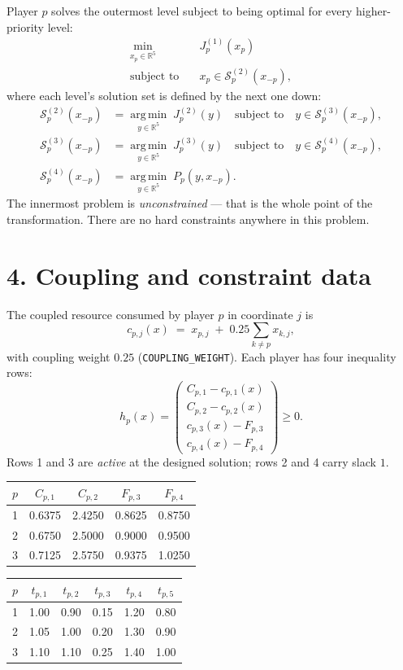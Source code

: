 \documentclass[11pt]{article}
\newcommand{\argmin}{\operatorname*{arg\,min}}
\begin{document}
Player \(p\) solves the outermost level subject to being optimal for every higher-priority
level:
\[
\begin{aligned}
  \min_{x_p \in \mathbb{R}^5} \quad & J_p^{(1)}(x_p) \\
  \text{subject to} \quad & x_p \in \mathcal{S}_p^{(2)}(x_{-p}),
\end{aligned}
\]
where each level's solution set is defined by the next one down:
\[
\begin{aligned}
  \mathcal{S}_p^{(2)}(x_{-p}) &= \argmin_{y \in \mathbb{R}^5} \; J_p^{(2)}(y)
    \quad \text{subject to} \quad y \in \mathcal{S}_p^{(3)}(x_{-p}), \\
  \mathcal{S}_p^{(3)}(x_{-p}) &= \argmin_{y \in \mathbb{R}^5} \; J_p^{(3)}(y)
    \quad \text{subject to} \quad y \in \mathcal{S}_p^{(4)}(x_{-p}), \\
  \mathcal{S}_p^{(4)}(x_{-p}) &= \argmin_{y \in \mathbb{R}^5} \; P_p(y, x_{-p}).
\end{aligned}
\]
The innermost problem is \emph{unconstrained} --- that is the whole point of the
transformation. There are no hard constraints anywhere in this problem.

\section*{4. Coupling and constraint data}

The coupled resource consumed by player \(p\) in coordinate \(j\) is
\[
  c_{p,j}(x) \;=\; x_{p,j} \;+\; 0.25 \sum_{k \neq p} x_{k,j},
\]
with coupling weight \(0.25\) (\texttt{COUPLING\_WEIGHT}). Each player has four inequality rows:
\[
  h_p(x) =
  \begin{pmatrix}
    C_{p,1} - c_{p,1}(x) \\
    C_{p,2} - c_{p,2}(x) \\
    c_{p,3}(x) - F_{p,3} \\
    c_{p,4}(x) - F_{p,4}
  \end{pmatrix} \ge 0 .
\]
Rows 1 and 3 are \emph{active} at the designed solution; rows 2 and 4 carry slack \(1\).

\begin{center}
\begin{tabular}{ccccc}
  \toprule
  \(p\) & \(C_{p,1}\) & \(C_{p,2}\) & \(F_{p,3}\) & \(F_{p,4}\) \\
  \midrule
  1 & 0.6375 & 2.4250 & 0.8625 & 0.8750 \\
  2 & 0.6750 & 2.5000 & 0.9000 & 0.9500 \\
  3 & 0.7125 & 2.5750 & 0.9375 & 1.0250 \\
  \bottomrule
\end{tabular}
\qquad
\begin{tabular}{cccccc}
  \toprule
  \(p\) & \(t_{p,1}\) & \(t_{p,2}\) & \(t_{p,3}\) & \(t_{p,4}\) & \(t_{p,5}\) \\
  \midrule
  1 & 1.00 & 0.90 & 0.15 & 1.20 & 0.80 \\
  2 & 1.05 & 1.00 & 0.20 & 1.30 & 0.90 \\
  3 & 1.10 & 1.10 & 0.25 & 1.40 & 1.00 \\
  \bottomrule
\end{tabular}
\end{center}
\end{document}
